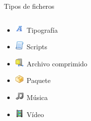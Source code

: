 \begin{frame}{Tipos de ficheros}
\begin{columns}
\begin{column}{0.5\textwidth}
\begin{itemize}
            \item \includegraphics{imgs/font.png}~Tipografía
            \item \includegraphics{imgs/script.png}~Scripts
            \item \includegraphics{imgs/compress.png}~Archivo comprimido
            \item \includegraphics{imgs/package.png}~Paquete
            \item \includegraphics{imgs/music.png}~Música
            \item \includegraphics{imgs/film.png}~Vídeo
        \end{itemize}
    \end{column}
    \end{columns}
\end{frame}

